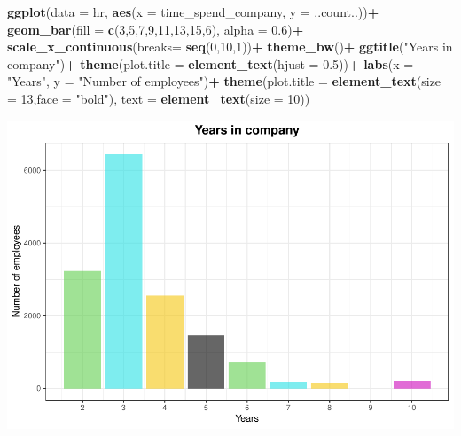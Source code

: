 \documentclass[
  11pt,
]{article}
\newenvironment{Shaded}{\begin{snugshade}}{\end{snugshade}}
\newcommand{\AttributeTok}[1]{\textcolor[rgb]{0.13,0.29,0.53}{#1}}
\newcommand{\DecValTok}[1]{\textcolor[rgb]{0.00,0.00,0.81}{#1}}
\newcommand{\FloatTok}[1]{\textcolor[rgb]{0.00,0.00,0.81}{#1}}
\newcommand{\FunctionTok}[1]{\textcolor[rgb]{0.13,0.29,0.53}{\textbf{#1}}}
\newcommand{\NormalTok}[1]{#1}
\newcommand{\SpecialCharTok}[1]{\textcolor[rgb]{0.81,0.36,0.00}{\textbf{#1}}}
\newcommand{\StringTok}[1]{\textcolor[rgb]{0.31,0.60,0.02}{#1}}
\begin{document}
\begin{Shaded}
\begin{Highlighting}[]
\FunctionTok{ggplot}\NormalTok{(}\AttributeTok{data =}\NormalTok{ hr, }\FunctionTok{aes}\NormalTok{(}\AttributeTok{x =}\NormalTok{ time\_spend\_company, }\AttributeTok{y =}\NormalTok{ ..count..))}\SpecialCharTok{+} 
  \FunctionTok{geom\_bar}\NormalTok{(}\AttributeTok{fill =} \FunctionTok{c}\NormalTok{(}\DecValTok{3}\NormalTok{,}\DecValTok{5}\NormalTok{,}\DecValTok{7}\NormalTok{,}\DecValTok{9}\NormalTok{,}\DecValTok{11}\NormalTok{,}\DecValTok{13}\NormalTok{,}\DecValTok{15}\NormalTok{,}\DecValTok{6}\NormalTok{), }
                     \AttributeTok{alpha =} \FloatTok{0.6}\NormalTok{)}\SpecialCharTok{+}
  \FunctionTok{scale\_x\_continuous}\NormalTok{(}\AttributeTok{breaks=} \FunctionTok{seq}\NormalTok{(}\DecValTok{0}\NormalTok{,}\DecValTok{10}\NormalTok{,}\DecValTok{1}\NormalTok{))}\SpecialCharTok{+}
  \FunctionTok{theme\_bw}\NormalTok{()}\SpecialCharTok{+}
  \FunctionTok{ggtitle}\NormalTok{(}\StringTok{"Years in company"}\NormalTok{)}\SpecialCharTok{+}
  \FunctionTok{theme}\NormalTok{(}\AttributeTok{plot.title =} \FunctionTok{element\_text}\NormalTok{(}\AttributeTok{hjust =} \FloatTok{0.5}\NormalTok{))}\SpecialCharTok{+}
  \FunctionTok{labs}\NormalTok{(}\AttributeTok{x =} \StringTok{"Years"}\NormalTok{, }\AttributeTok{y =} \StringTok{"Number of employees"}\NormalTok{)}\SpecialCharTok{+}
  \FunctionTok{theme}\NormalTok{(}\AttributeTok{plot.title =} \FunctionTok{element\_text}\NormalTok{(}\AttributeTok{size =} \DecValTok{13}\NormalTok{,}\AttributeTok{face =} \StringTok{"bold"}\NormalTok{),}
              \AttributeTok{text =} \FunctionTok{element\_text}\NormalTok{(}\AttributeTok{size =} \DecValTok{10}\NormalTok{))}
\end{Highlighting}
\end{Shaded}

\includegraphics[width=0.9\linewidth]{OWUSU_project_files/figure-latex/unnamed-chunk-12-1}
\end{document}
